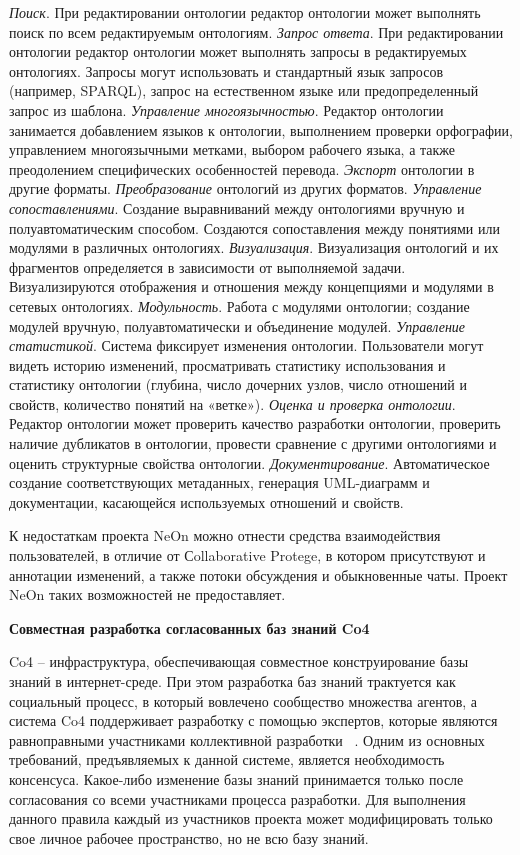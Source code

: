\textit{Поиск}. При редактировании онтологии редактор онтологии может выполнять поиск по всем редактируемым онтологиям.
\textit{Запрос ответа}. При редактировании онтологии редактор онтологии может выполнять запросы в редактируемых онтологиях. Запросы могут использовать и стандартный язык запросов (например, SPARQL), запрос на естественном языке или предопределенный запрос из шаблона.
\textit{Управление многоязычностью}. Редактор онтологии занимается добавлением языков к онтологии, выполнением проверки орфографии, управлением многоязычными метками, выбором рабочего языка, а также преодолением специфических особенностей перевода.
\textit{Экспорт} онтологии в другие форматы.
\textit{Преобразование} онтологий из других форматов.
\textit{Управление сопоставлениями}. Создание выравниваний между онтологиями вручную и полуавтоматическим способом. Создаются сопоставления между понятиями или модулями в различных онтологиях.
\textit{Визуализация}. Визуализация онтологий и их фрагментов определяется в зависимости от выполняемой задачи. Визуализируются отображения и отношения между концепциями и модулями в сетевых онтологиях.
\textit{Модульность}. Работа с модулями онтологии; создание модулей вручную, полуавтоматически и объединение модулей.
\textit{Управление статистикой}. Система фиксирует изменения онтологии. Пользователи могут видеть историю изменений, просматривать статистику использования и статистику онтологии (глубина, число дочерних узлов, число отношений и свойств, количество понятий на «ветке»).
\textit{Оценка и проверка онтологии}. Редактор онтологии может проверить качество разработки онтологии, проверить наличие дубликатов в онтологии, провести сравнение с другими онтологиями и оценить структурные свойства онтологии.
\textit{Документирование}. Автоматическое создание соответствующих метаданных, генерация UML-диаграмм и документации, касающейся используемых отношений и свойств.

К недостаткам проекта NeOn можно отнести средства взаимодействия пользователей, в отличие от Сollaborative Protege, в котором присутствуют и аннотации изменений, а также потоки обсуждения и обыкновенные чаты. Проект NeOn таких возможностей не предоставляет. 

\textbf{Совместная разработка согласованных баз знаний Co4}

Co4 – инфраструктура, обеспечивающая совместное конструирование базы знаний в интернет-среде. При этом разработка баз знаний трактуется как социальный процесс, в который вовлечено сообщество множества агентов, а система Co4 поддерживает разработку с помощью экспертов, которые являются равноправными участниками коллективной разработки ~\cite{Euzenat1996}. Одним из основных требований, предъявляемых к данной системе, является необходимость консенсуса. Какое-либо изменение базы знаний принимается только после согласования со всеми участниками процесса разработки. Для выполнения данного правила каждый из участников проекта может модифицировать только свое личное рабочее пространство, но не всю базу знаний.

